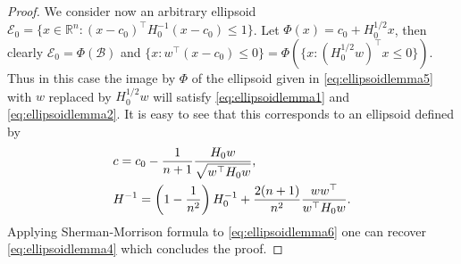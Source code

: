 \documentclass[openany]{now}
\newcommand{\R}{\mathbb{R}}
\newcommand{\cB}{\mathcal{B}}
\newcommand{\cE}{\mathcal{E}}
\begin{document}
\begin{proof}
We consider now an arbitrary ellipsoid $\cE_0 = \{x \in \R^n : (x - c_0)^{\top} H_0^{-1} (x-c_0) \leq 1 \}$. Let $\Phi(x) = c_0 + H_0^{1/2} x$, then clearly $\cE_0 = \Phi(\cB)$ and $\{x : w^{\top}(x - c_0) \leq 0\} = \Phi(\{x : (H_0^{1/2} w)^{\top} x \leq 0\})$. Thus in this case the image by $\Phi$ of the ellipsoid given in \eqref{eq:ellipsoidlemma5} with $w$ replaced by $H_0^{1/2} w$ will satisfy \eqref{eq:ellipsoidlemma1} and \eqref{eq:ellipsoidlemma2}. It is easy to see that this corresponds to an ellipsoid defined by
\begin{align}
& c = c_0 - \frac{1}{n+1} \frac{H_0 w}{\sqrt{w^{\top} H_0 w}} , \notag \\
& H^{-1} = \left(1 - \frac{1}{n^2}\right) H_0^{-1} + \frac{2(n+1)}{n^2} \frac{w w^{\top}}{w^{\top} H_0 w} . \label{eq:ellipsoidlemma6}
\end{align}
Applying Sherman-Morrison formula to \eqref{eq:ellipsoidlemma6} one can recover \eqref{eq:ellipsoidlemma4} which concludes the proof.
\end{proof}
\end{document}
